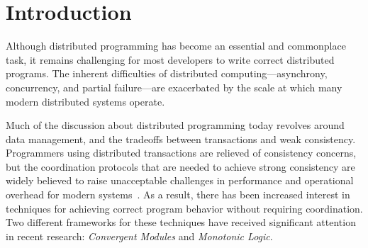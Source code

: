\section{Introduction} 
\label{sec:intro}
Although distributed programming has become an essential and commonplace task,
it remains challenging for most developers to write correct distributed
programs. The inherent difficulties of distributed computing---asynchrony,
concurrency, and partial failure---are exacerbated by the scale at which many
modern distributed systems operate.


Much of the discussion about distributed programming today revolves around data
management, and the tradeoffs between transactions and weak
consistency. Programmers using distributed transactions are relieved of
consistency concerns, but the coordination protocols that are needed to achieve
strong consistency are widely believed to raise unacceptable challenges in
performance and operational overhead for modern
systems~\cite{Birman2009,Helland2009}. As a result, there has been increased
interest in techniques for achieving correct program behavior without requiring
coordination.  Two different frameworks for these techniques have received
significant attention in recent research: \emph{Convergent Modules} and
\emph{Monotonic Logic}.


